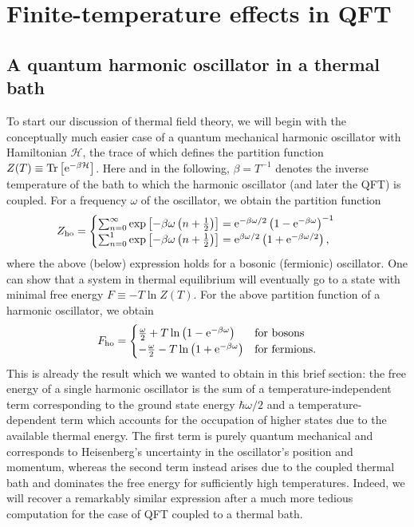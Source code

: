 \section{Finite-temperature effects in QFT} \label{sec:finite-temp}
\subsection{A quantum harmonic oscillator in a thermal bath}

To start our discussion of thermal field theory, we will begin with the conceptually much easier case of a quantum mechanical harmonic oscillator with Hamiltonian $\mathcal{H}$, the trace of which defines the partition function $Z(T) \equiv \text{Tr}\left[ \mathrm{e}^{- \beta \mathcal{H}} \right]$. Here and in the following, $\beta = T^{-1}$ denotes the inverse temperature of the bath to which the harmonic oscillator (and later the \ac{QFT}) is coupled. For a frequency $\omega$ of the oscillator, we obtain the partition function~\cite{Hindmarsh:2020hop}
\begin{align}
	Z_{\text{ho}} &= \begin{cases}
		\sum_{n = 0}^{\infty} \exp \left[ - \beta \omega \left( n + \frac{1}{2} \right) \right] = \mathrm{e}^{- \beta \omega /2} \left( 1 - \mathrm{e}^{- \beta \omega} \right)^{-1}\\
		\sum_{n = 0}^{1} \exp \left[ - \beta \omega \left( n + \frac{1}{2} \right) \right] = \mathrm{e}^{\beta  \omega /2}  \left( 1 + \mathrm{e}^{- \beta \omega / 2} \right),
	\end{cases}
\end{align}
where the above (below) expression holds for a bosonic (fermionic) oscillator. One can show that a system in thermal equilibrium will eventually go to a state with minimal free energy $F	 \equiv - T \ln Z(T)$. For the above partition function of a harmonic oscillator, we obtain
\begin{align}
	F_{\text{ho}} = \begin{cases}
		\frac{\omega}{2} + T \ln \left( 1 - \mathrm{e}^{-\beta \omega} \right) &\text{for bosons}\\
		-\frac{\omega}{2} - T \ln \left( 1 + \mathrm{e}^{-\beta \omega} \right) &\text{for fermions} .
	\end{cases} \label{eq:FE_ho}
\end{align}
This is already the result which we wanted to obtain in this brief section: the free energy of a single harmonic oscillator is the sum of a temperature-independent term corresponding to the ground state energy $\hbar \omega/2$ and a temperature-dependent  term which accounts for the occupation of higher states due to the available thermal energy. The first term is purely quantum mechanical and corresponds to Heisenberg's uncertainty in the oscillator's position and momentum, whereas the second term instead arises due to the coupled thermal bath and dominates the free energy for sufficiently high temperatures. Indeed, we will recover a remarkably similar expression after a much more tedious computation for the case of \ac{QFT} coupled to a thermal bath.


